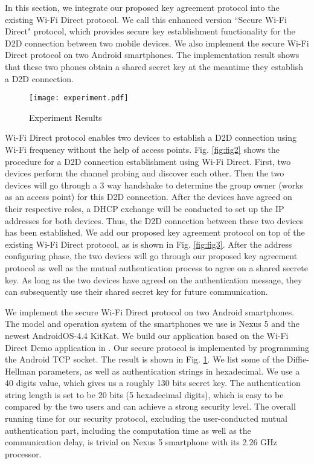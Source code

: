 \documentclass[conference]{IEEEtran}
\begin{document}
In this section, we integrate our proposed key agreement protocol into the existing Wi-Fi Direct protocol. We call this enhanced version ``Secure Wi-Fi Direct" protocol, which provides secure key establishment functionality for the D2D connection  between two mobile devices. We also implement the secure Wi-Fi Direct protocol on two Android smartphones. The implementation result shows that these two phones obtain a shared secret key at the meantime they establish a D2D connection. 

\begin{figure}[htbp]
  \centering
  \scalebox{0.4}
  {\texttt{[image: experiment.pdf]}}
  \caption{Experiment Results}
  \label{fig:fig1}
\end{figure}

Wi-Fi Direct protocol enables two devices to establish a D2D connection using Wi-Fi frequency without the help of access points. Fig. \ref{fig:fig2} shows the procedure for a D2D connection establishment using Wi-Fi Direct. First, two devices perform the channel probing and discover each other. Then the two devices will go through a 3 way handshake to determine the group owner (works as an access point) for this D2D connection. After the devices have agreed on their respective roles, a DHCP exchange will be conducted to set up the IP addresses for both devices. Thus, the D2D connection between these two devices has been established. We add our proposed key agreement protocol on top of the existing Wi-Fi Direct protocol, as is shown in Fig. \ref{fig:fig3}. After the address configuring phase, the two devices will go through our proposed key agreement protocol as well as the mutual authentication process to agree on a shared secrete key. As long as the two devices have agreed on the authentication message, they can subsequently use their shared secret key for future communication.

We implement the secure Wi-Fi Direct protocol on two Android smartphones. The model and operation system of the smartphones we use is Nexus 5 and the newest AndroidOS-4.4 KitKat. We build our application based on the Wi-Fi Direct Demo application in \cite{demo}. Our secure protocol is implemented by programming the Android TCP socket.  The result is shown in Fig. \ref{fig:fig1}. We list some of the Diffie-Hellman parameters, as well as authentication  strings in hexadecimal. We use a 40 digits  value, which gives us a roughly 130 bits secret key. The authentication string length is set to be 20 bits (5 hexadecimal digits), which is easy to be compared by the two users and can achieve a strong security level. The overall running time for our security protocol, excluding the user-conducted mutual authentication part, including the computation time as well as the communication delay, is trivial on Nexus 5 smartphone with its 2.26 GHz processor.
\end{document}
